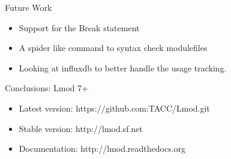 \documentclass{beamer}
\begin{document}
\begin{frame}{Future Work}
  \begin{itemize}
    \item Support for the Break statement
    \item A spider like command to syntax check modulefiles
    \item Looking at influxdb to better handle the usage tracking.
  \end{itemize}
\end{frame}

\begin{frame}{Conclusions: Lmod 7+}
  \begin{itemize}
    \item Latest version: https://github.com:TACC/Lmod.git
    \item Stable version: http://lmod.sf.net
    \item Documentation:  http://lmod.readthedocs.org
  \end{itemize}
\end{frame}
\end{document}
